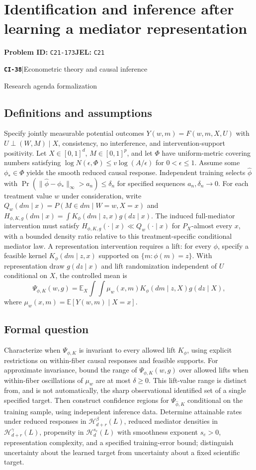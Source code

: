 \documentclass[11pt,a4paper]{article}
\newcommand{\E}{\mathbb E}
\newcommand{\entrymeta}[3]{{\sffamily\small\color{muted}\textbf{\texttt{#1}}\quad|\quad #2\par #3\par}}
\begin{document}
\section*{Identification and inference after learning a mediator representation}
\textbf{Problem ID:} \texttt{C21-173}\quad \textbf{JEL:} \texttt{C21}\par
\label{problem:OP-0517}
\label{beyond:CI-38}
\entrymeta{CI-38}{Econometric theory and causal inference}{Research agenda formalization}
\subsection*{Definitions and assumptions}
Specify jointly measurable potential outcomes $Y(w,m)=F(w,m,X,U)$ with $U\perp(W,M)\mid X$, consistency, no interference, and intervention-support positivity. Let $X\in[0,1]^d$, $M\in[0,1]^p$, and let $\Phi$ have uniform-metric covering numbers satisfying $\log N(\epsilon,\Phi)\leq v\log(A/\epsilon)$ for $0<\epsilon\leq1$. Assume some $\phi_*\in\Phi$ yields the smooth reduced causal response. Independent training selects $\widehat\phi$ with $\Pr(\|\widehat\phi-\phi_*\|_\infty>a_n)\leq\delta_n$ for specified sequences $a_n,\delta_n\to0$. For each treatment value $w$ under consideration, write $Q_w(dm\mid x)=P(M\in dm\mid W=w,X=x)$ and $H_{\phi,K,g}(dm\mid x)=\int K_\phi(dm\mid z,x)g(dz\mid x)$. The induced full-mediator intervention must satisfy $H_{\phi,K,g}(\cdot\mid x)\ll Q_w(\cdot\mid x)$ for $P_X$-almost every $x$, with a bounded density ratio relative to this treatment-specific conditional mediator law. A representation intervention requires a lift: for every $\phi$, specify a feasible kernel $K_\phi(dm\mid z,x)$ supported on $\{m:\phi(m)=z\}$. With representation draw $g(dz\mid x)$ and lift randomization independent of $U$ conditional on $X$, the controlled mean is
\[
 \Psi_{\phi,K}(w,g)=
 \E_X\int\!\int\mu_w(x,m)K_\phi(dm\mid z,X)g(dz\mid X),
\]
where $\mu_w(x,m)=\E[Y(w,m)\mid X=x]$.
\subsection*{Formal question}
Characterize when $\Psi_{\phi,K}$ is invariant to every allowed lift $K_\phi$, using explicit restrictions on within-fiber causal responses and feasible supports. For approximate invariance, bound the range of $\Psi_{\phi,K}(w,g)$ over allowed lifts when within-fiber oscillations of $\mu_w$ are at most $\delta\geq0$. This lift-value range is distinct from, and is not automatically, the sharp observational identified set of a single specified target. Then construct confidence regions for $\Psi_{\widehat\phi,K}$ conditional on the training sample, using independent inference data. Determine attainable rates under reduced responses in $\mathcal H_{d+r}^\beta(L)$, reduced mediator densities in $\mathcal H_{d+r}^\gamma(L)$, propensity in $\mathcal H_d^{s_e}(L)$ with smoothness exponent $s_e>0$, representation complexity, and a specified training-error bound; distinguish uncertainty about the learned target from uncertainty about a fixed scientific target.
\end{document}
